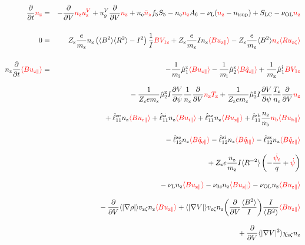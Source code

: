 \documentclass[11pt]{article}
\def\r#1{{\rm#1}}
\def\aves#1{\langle#1\rangle}
\def\dd#1#2{\frac{\partial #1}{\partial #2}}
\def\para{\parallel}
\def\ddV{\frac{\partial}{\partial V}}
\def\ddt{\frac{\partial}{\partial t}}
\def\psid{\dot{\psi}}
\def\psit{\psi_t}
\def\psitd{\dot{\psit}}
\def\mi{m_\r{i}}
\def\mz{m_\r{z}}
\def\nee{n_\r{e}}
\def\nz{n_\r{z}}
\def\nb{n_\r{b}}
\def\Tz{T_\r{z}}
\def\Zz{Z_\r{z}}
\def\uzt#1{u_{\r{#1}\zeta}}
\def\upara#1{u_{\r{#1}\para}}
\def\qhatpara#1{\hat{q}_{\r{#1}\para}}
\def\uV#1{u_\r{#1}^V}
\def\ugV{u_{g}^V}
\def\chis#1{\chi_\r{#1}}
\def\nun#1{\nu_\r{0#1}}
\def\nsup#1{n_\r{#1sup}}
\def\bri{\aves{B^2}\aves{R^2} - I^2}
\def\nnz{\bar{n}_{z}}
\def\nuL{\nu_\r{L}}
\def\nuOL{\nu_\r{OL}}
\def\red#1{\textcolor{red}{#1}}
\begin{document}

%
\begin{eqnarray}
  \ddt \red{\nz} &=&
%
  - \ddV \red{\nz\uV{z}}
%
  + \ugV \ddV \red{\nz}
%
  + \nee \red{\nnz} f_5S_5 - \nee \red{\nz} A_6 
%
  - \nuL (\red{\nz} - \nsup{i}) 
%
  + S_\r{LC}
%
  - \nuOL \red{\nz}
%
\\[5mm]
  0 &=&
%
    \Zz \frac{e}{\mz} \nz \left( \bri \right) \frac{1}{I} \red{B V_{1\r{z}}}
%
  + \Zz \frac{e}{\mz} I \nz \red{\aves{B\upara{z}}}
%
  - \Zz \frac{e}{\mz} \aves{B^2} \red{\nz \aves{R\uzt{z}}}
\\[5mm]
  \nz \ddt \red{\aves{B \upara{z}}} &=&
%
  - \frac{1}{\mi} \hat{\mu}_1^\r{z} \red{\aves{B \upara{z}}}
  - \frac{1}{\mi} \hat{\mu}_2^\r{z} \red{\aves{B \qhatpara{z}}}
%
  + \frac{1}{\mz} \hat{\mu}_1^\r{i} \red{B V_{1\r{z}}} 
\nonumber\\[3mm]&&{}
%
  - \frac{1}{\Zz e\mz} \hat{\mu}_2^\r{z} I \dd{V}{\psi} \frac{1}{\nz}
  \ddV \red{\nz\Tz}
  + \frac{1}{\Zz e\mz} \hat{\mu}_2^\r{z} I \dd{V}{\psi} \frac{\Tz}{\nz}
  \ddV \red{\nz}
\nonumber\\[3mm]&&{}
%
  + \hat{\ell}_{11}^{\r{ze}} \nz \red{\aves{B \upara{e}}}
  + \hat{\ell}_{11}^{\r{zi}} \nz \red{\aves{B \upara{i}}}
  + \hat{\ell}_{11}^{\r{zz}} \nz \red{\aves{B \upara{z}}}
  + \hat{\ell}_{11}^{\r{zb}} \frac{\nz}{\nb} \red{\nb \aves{B \upara{b}}}
\nonumber\\[3mm]&&{}
%
  - \hat{\ell}_{12}^{\r{ze}} \nz \red{\aves{B \qhatpara{e}}}
  - \hat{\ell}_{12}^{\r{zi}} \nz \red{\aves{B \qhatpara{i}}}
  - \hat{\ell}_{12}^{\r{zz}} \nz \red{\aves{B \qhatpara{z}}}
\nonumber\\[3mm]&&{}
%
  + \Zz e \frac{\nz}{\mz} I \aves{R^{-2}} \left( - \frac{\red{\psitd}}{q} + \red{\psid} \right)
%
%
\nonumber\\[3mm]&&{}
%
  - \nuL  \nz \red{\aves{B \upara{z}}}
%
  - \nun{z} \nz \red{\aves{B \upara{z}}}
%
  - \nuOL \nz \red{\aves{B \upara{z}}}
\nonumber\\[3mm]&&{}
%
  - \ddV \aves{|\nabla \rho|} v_{\r{z}\zeta} \nz \red{\aves{B \upara{z}}}
%
  + \aves{|\nabla V|} v_{\r{z}\zeta} \nz 
  \biggl(\ddV \frac{\aves{B^2}}{I} \biggl) \frac{I}{\aves{B^2}} \red{\aves{B \upara{z}}}
\nonumber\\[3mm]&&{}
%
  + \ddV \aves{|\nabla V|^2} \chis{z\zeta} \nz

\end{eqnarray}
\end{document}
